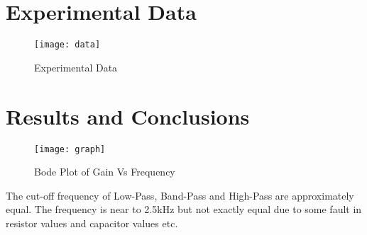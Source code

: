 \documentclass[
	letterpaper, %
	10pt, %
]{CSUniSchoolLabReport}
\begin{document}
\section{Experimental Data}

\begin{figure}[H] %
	\centering %
	\texttt{[image: data]} %
	\caption{Experimental Data}
\end{figure}
\section{Results and Conclusions}
\begin{figure}[H] %
	\centering %
	\texttt{[image: graph]} %
	\caption{Bode Plot of Gain Vs Frequency}
\end{figure}
The cut-off frequency of Low-Pass, Band-Pass and High-Pass are approximately equal. The frequency is near to 2.5kHz but not exactly equal due to some fault in resistor values and capacitor values etc. 

\end{document}
